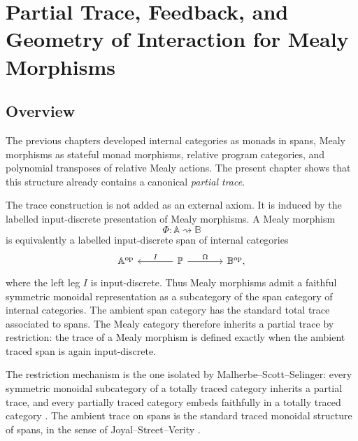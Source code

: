 \chapter{Partial Trace, Feedback, and Geometry of Interaction for Mealy Morphisms}
\label{ch:partial-trace-mealy}

\section{Overview}
\label{sec:partial-trace-overview}

The previous chapters developed internal categories as monads in spans,
Mealy morphisms as stateful monad morphisms, relative program categories, and
polynomial transposes of relative Mealy actions.  The present chapter shows
that this structure already contains a canonical \emph{partial trace}.

The trace construction is not added as an external axiom.  It is induced by
the labelled input-discrete presentation of Mealy morphisms.  A Mealy morphism
\[
\Phi:\mathbb A\rightsquigarrow\mathbb B
\]
is equivalently a labelled input-discrete span of internal categories
\[
\begin{tikzcd}[column sep=large]
\mathbb A^{\mathrm{op}}
&
\mathbb P
  \arrow[l, "I"']
  \arrow[r, "\Omega"]
&
\mathbb B^{\mathrm{op}},
\end{tikzcd}
\]
where the left leg \(I\) is input-discrete.  Thus Mealy morphisms admit a
faithful symmetric monoidal representation as a subcategory of the span
category of internal categories.  The ambient span category has the standard
total trace associated to spans.  The Mealy category therefore inherits a
partial trace by restriction: the trace of a Mealy morphism is defined exactly
when the ambient traced span is again input-discrete.

The restriction mechanism is the one isolated by
Malherbe--Scott--Selinger: every symmetric monoidal subcategory of a totally
traced category inherits a partial trace, and every partially traced category
embeds faithfully in a totally traced category
\cite{MalherbeScottSelingerPartiallyTracedCategories}.  The ambient trace on
spans is the standard traced monoidal structure of spans, in the sense of
Joyal--Street--Verity
\cite{JoyalStreetVerityTracedMonoidalCategories}.

